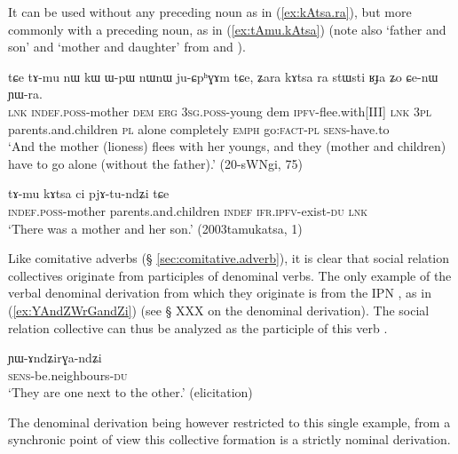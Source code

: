 It can be used without any preceding noun as in (\ref{ex:kAtsa.ra}), but more commonly with a preceding noun, as in (\ref{ex:tAmu.kAtsa}) (note also  `father and son' and  `mother and daughter' from  and ).

\begin{exe}
\ex \label{ex:kAtsa.ra}
\gll tɕe tɤ-mu nɯ kɯ ɯ-pɯ nɯnɯ ju-ɕpʰɣɤm tɕe, ʑara kɤtsa ra stɯsti ʁɟa ʑo ɕe-nɯ ɲɯ-ra. \\
\textsc{lnk} \textsc{indef}.\textsc{poss}-mother \textsc{dem} \textsc{erg} \textsc{3sg}.\textsc{poss}-young dem \textsc{ipfv}-flee.with[III] \textsc{lnk} \textsc{3pl} parents.and.children \textsc{pl} alone completely \textsc{emph} go:\textsc{fact}-\textsc{pl} \textsc{sens}-have.to \\
\glt `And the mother (lioness) flees with her youngs, and they (mother and children) have to go alone (without the father).' (20-sWNgi, 75)
\end{exe}

\begin{exe}
\ex \label{ex:tAmu.kAtsa}
\gll
tɤ-mu kɤtsa ci pjɤ-tu-ndʑi tɕe \\
\textsc{indef}.\textsc{poss}-mother  parents.and.children \textsc{indef} \textsc{ifr}.\textsc{ipfv}-exist-\textsc{du} \textsc{lnk} \\
\glt `There was a mother and her son.' (2003tamukatsa, 1)
\end{exe}

Like comitative adverbs (§ \ref{sec:comitative.adverb}), it is clear that social relation collectives originate from participles of denominal verbs. The only example of the verbal denominal  derivation from which they originate is  from the IPN , as in (\ref{ex:YAndZWrGandZi}) (see § XXX on the denominal derivation). The social relation collective  can thus be analyzed as the participle of this verb .  

\begin{exe}
\ex \label{ex:YAndZWrGandZi}
\gll ɲɯ-ɤndʑirɣa-ndʑi \\
\textsc{sens}-be.neighbours-\textsc{du} \\
\glt `They are one next to the other.' (elicitation)
\end{exe}

The  denominal derivation being however restricted to this single example, from a synchronic point of view this collective formation is a strictly nominal derivation.

